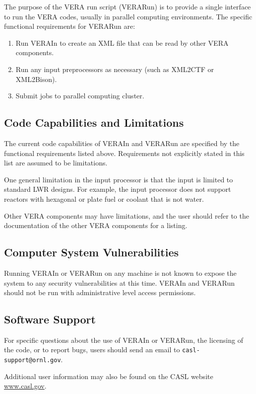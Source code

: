 The purpose of the VERA run script (VERARun) is to provide a single
interface to run the VERA codes, usually in parallel computing environments.
The specific functional requirements for VERARun are:
\begin{enumerate}
\item Run VERAIn to create an XML file that can be read by other VERA components.
\item Run any input preprocessors as necessary (such as XML2CTF or XML2Bison).
\item Submit jobs to parallel computing cluster.
\end{enumerate}


\subsection{Code Capabilities and Limitations}

The current code capabilities of VERAIn and VERARun are specified by the functional requirements listed above.
Requirements not explicitly stated in this list are assumed to be limitations.

One general limitation in the input processor is that the input is limited to standard LWR designs.
For example, the input processor does not support reactors with hexagonal or plate fuel or coolant
that is not water.

Other VERA components may have limitations, and the user should refer to the documentation
of the other VERA components for a listing.

\subsection{Computer System Vulnerabilities}

Running VERAIn or VERARun on any machine is not known to expose the system to any security
vulnerabilities at this time. 
VERAIn and VERARun should not be run with administrative level access permissions.

\subsection{Software Support}

For specific questions about the use of VERAIn or VERARun, the licensing of the code, or to report bugs,
users should send an email to {\tt casl-support@ornl.gov}.

Additional user information may also be found on the CASL website \href{http://www.casl.gov}{www.casl.gov}.








